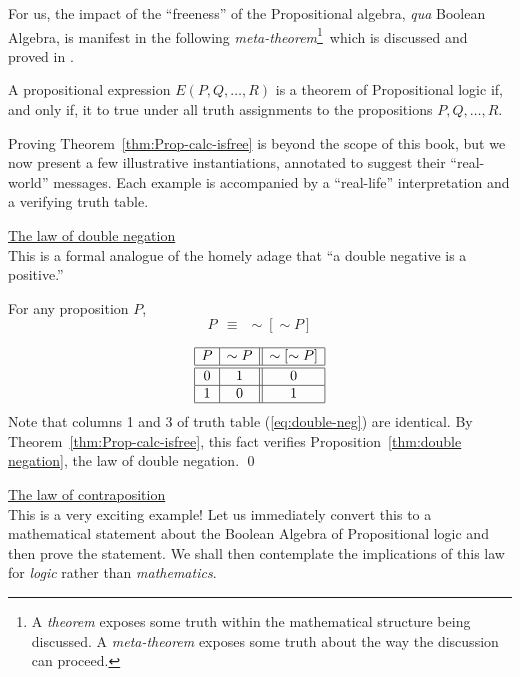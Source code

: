 For us, the impact of the ``freeness'' of the Propositional algebra,
{\it qua} Boolean Algebra, is manifest in the following
{\em meta-theorem}\footnote{A {\it theorem} exposes some truth within
  the mathematical structure being discussed.  A {\it meta-theorem}
  exposes some truth about the way the discussion can proceed.}~which
is discussed and proved in \cite{Rosser53}.

\begin{theorem}
\label{thm:Prop-calc-isfree}
A propositional expression $E(P, Q, \ldots, R)$ is a theorem of
Propositional logic if, and only if, it to {\sc true} under all truth
assignments to the propositions $P, Q, \ldots, R$.
\end{theorem}

Proving Theorem~\ref{thm:Prop-calc-isfree} is beyond the scope of this
book, but we now present a few illustrative instantiations, annotated
to suggest their ``real-world'' messages.  Each example is accompanied
by a ``real-life'' interpretation and a verifying truth table.

\bigskip

\noindent
\underline{\small\sf The law of double negation} \\
This is a formal analogue of the homely adage that ``a double negative
is a positive.''

\begin{prop}
\label{thm:double negation}
For any proposition $P$,
\[ P \ \ \equiv \ \ \sim [\sim P] \]
\end{prop}

\begin{equation}
\label{eq:double-neg}
\begin{array}{|c|c||c|}
\hline
P & \sim P & \sim[\sim P] \\
\hline
\hline
0 & 1 & 0 \\
\hline
1 & 0 & 1 \\
\hline
\end{array}
\end{equation}
Note that columns 1 and 3 of truth table (\ref{eq:double-neg}) are
identical.  By Theorem~\ref{thm:Prop-calc-isfree}, this fact verifies
Proposition~\ref{thm:double negation}, the law of double negation.
\qed

\bigskip

\noindent 
\underline{\small\sf The law of contraposition} \\
This is a very exciting example!  Let us immediately convert this to a
mathematical statement about the Boolean Algebra of Propositional
logic and then prove the statement.  We shall then contemplate the
implications of this law for {\em logic} rather than {\em
  mathematics}.


